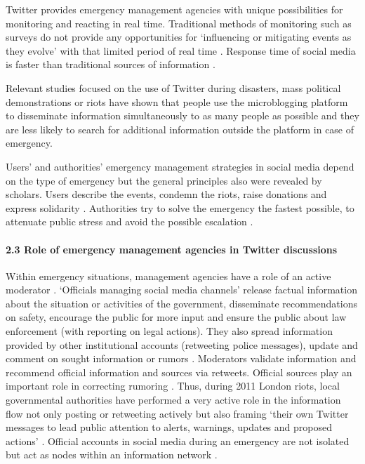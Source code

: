 Twitter provides emergency management agencies with unique possibilities for monitoring and reacting in real time. Traditional methods of monitoring such as surveys do not provide any opportunities for ‘influencing or mitigating events as they evolve’ with that limited period of real time \cite[p.~481]{KavanaughFoxSheetz}. Response time of social media is faster than traditional sources of information \cite{HughesPalenSutton,JungPark,QuHuangZhang}.

Relevant studies focused on the use of Twitter during disasters, mass political demonstrations or riots \cite{HoustonHawthornePerreault,HughesPalen,JinBrookeLucinda} have shown that people use the microblogging platform to disseminate information simultaneously to as many people as possible and they are less likely to search for additional information outside the platform in case of emergency.

Users’ and authorities’ emergency management strategies in social media depend on the type of emergency \cite{PalenViewegAnderson} but the general principles also were revealed by scholars. Users describe the events, condemn the riots, raise donations and express solidarity \cite{GolbeckGrimesRogers}. Authorities try to solve the emergency the fastest possible, to attenuate public stress and avoid the possible escalation \cite{PalenViewegAnderson}.

\paragraph{2.3 Role of emergency management agencies in Twitter discussions}
Within emergency situations, management agencies have a role of an active moderator \cite{BertotJaegerGrimes}. ‘Officials managing social media channels’ \cite[p.~2]{AlSaggafSimmons} release factual information about the situation or activities of the government, disseminate recommendations on safety, encourage the public for more input and ensure the public about law enforcement (with reporting on legal actions). They also spread information provided by other institutional accounts (retweeting police messages), update and comment on sought information or rumors \cite[p.~92]{PalenViewegAnderson}. Moderators validate information and recommend official information and sources \cite{BertotJaegerMunson} via retweets. Official sources play an important role in correcting rumoring \cite{AlSaggafSimmons,OhAgrawalRao}. Thus, during 2011 London riots, local governmental authorities have performed a very active role in the information flow not only posting or retweeting actively but also framing ‘their own Twitter messages to lead public attention to alerts, warnings, updates and proposed actions’ \cite[p.~93]{PalenViewegAnderson}. Official accounts in social media during an emergency are not isolated but act as nodes within an information network \cite{JinBrookeLucinda,PalenViewegAnderson}.


